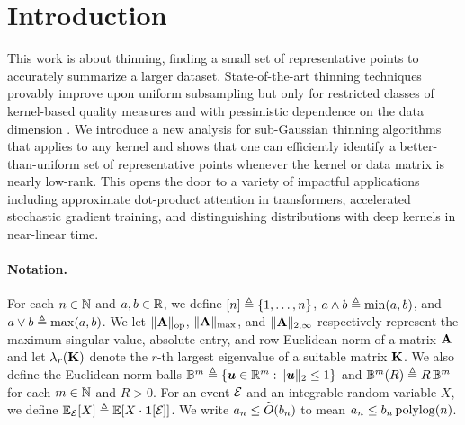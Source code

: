 %

%
\section{Introduction}
\label{sec:intro}
%

%

%

%

%

This work is about thinning,  %
finding a small set of representative points to accurately summarize a larger dataset. 
State-of-the-art thinning %
techniques %
provably improve upon uniform subsampling %
but only for restricted classes of kernel-based quality measures %
and with pessimistic dependence on the data dimension \citep[see, e.g.,][]{harvey2014near,phillips2020near,alweiss2020discrepancyminimizationselfbalancingwalk,dwivedi2024kernel,dwivedi2021generalized,shetty2022distributioncompressionnearlineartime,li2024debiased}. 
%
We introduce a new analysis for sub-Gaussian thinning algorithms that applies to any kernel and shows that one can efficiently identify a better-than-uniform set of representative points whenever the 
kernel or data matrix 
%
is nearly low-rank.
This opens the door to a variety of impactful applications including approximate dot-product attention in transformers, accelerated stochastic gradient training, and distinguishing distributions with deep kernels in near-linear time.

%
%
%
%
%

\paragraph{Notation.}
%
%
For each $n\in\mathbb{N}$ and $a,b\in\mathbb{R}$,  we define $[n] \triangleq \{1,\dots,n\}$, $a \wedge b \triangleq \min(a,b)$, and $a \vee b \triangleq \max(a,b)$.
We let $\|{\mathbf{A}}\|_{\operatorname{op}}$, $\|{\mathbf{A}}\|_{\max}$, and $\|{\mathbf{A}}\|_{2,\infty}$ respectively represent the maximum singular value, absolute entry, and row Euclidean norm of a matrix $\mathbf{A}$ and let $\lambda_{r}(\mathbf{K})$ denote the $r$-th largest eigenvalue of a suitable matrix $\mathbf{K}$. 
%
We also define the Euclidean norm balls
$\mathbb{B}^m 
    \triangleq 
\{ \boldsymbol{u} \in\mathbb{R}^{m} : \|{\boldsymbol{u}}\|_2 \leq 1\}$ 
and $\mathbb{B}^m(R)\triangleq R\,\mathbb{B}^m$ for each $m\in\mathbb{N}$ and $R>0$.
For an event $\mathcal{E}_{}$ and an integrable random variable $X$, we define $\Esub{\event}[X] \defeq \E[X\cdot\indic{\event}]$.
We write $a_n \leq \widetilde{O}(b_n)$ to mean $a_n \leq b_n \operatorname{polylog}(n)$.
